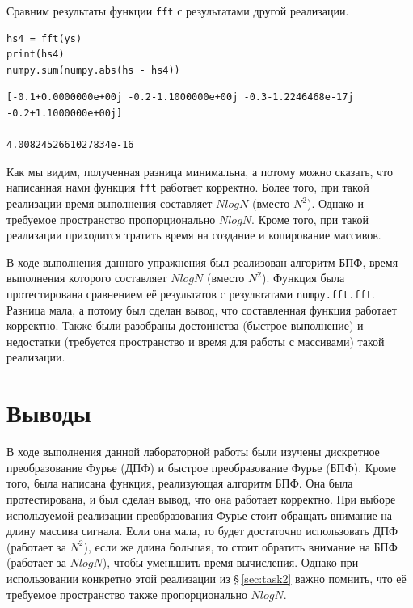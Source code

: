 \documentclass[a4paper, 14pt]{extarticle}
\begin{document}
    Сравним результаты функции \texttt{fft} с результатами другой реализации.

    \begin{lstlisting}[caption= Сравнение результатов функций \texttt{fft} и \texttt{numpy.fft.fft}., label={lst:task2_compare_fft}]
hs4 = fft(ys)
print(hs4)
numpy.sum(numpy.abs(hs - hs4))  \end{lstlisting}

    \begin{lstlisting}[numbers=none, caption= Результаты сравнения., label={lst:task2_fft_res}]
[-0.1+0.0000000e+00j -0.2-1.1000000e+00j -0.3-1.2246468e-17j -0.2+1.1000000e+00j]

4.0082452661027834e-16  \end{lstlisting}

    Как мы видим, полученная разница минимальна, а потому можно сказать, что написанная нами функция \texttt{fft}
    работает корректно. Более того, при такой реализации время выполнения составляет $N log N$ (вместо $N^2$).
    Однако и требуемое пространство пропорционально $N log N$. Кроме того, при такой реализации приходится тратить время
    на создание и копирование массивов.

    В ходе выполнения данного упражнения был реализован алгоритм БПФ, время выполнения которого составляет $N log N$
    (вместо $N^2$). Функция была протестирована сравнением её результатов с результатами \texttt{numpy.fft.fft}.
    Разница мала, а потому был сделан вывод, что составленная функция работает корректно. Также были разобраны
    достоинства (быстрое выполнение) и недостатки (требуется пространство и время для работы с массивами) такой реализации.

    \newpage

    \section{Выводы}
    \label{sec:conclusions}

    В ходе выполнения данной лабораторной работы были изучены дискретное преобразование Фурье (ДПФ) и быстрое
    преобразование Фурье (БПФ). Кроме того, была написана функция, реализующая алгоритм БПФ. Она была протестирована, и
    был сделан вывод, что она работает корректно. При выборе используемой реализации преобразования Фурье стоит обращать
    внимание на длину массива сигнала. Если она мала, то будет достаточно использовать ДПФ (работает за $N^2$), если же длина большая, то
    стоит обратить внимание на БПФ (работает за $N log N$), чтобы уменьшить время вычисления. Однако при использовании
    конкретно этой реализации из \S\,\ref{sec:task2} важно помнить, что её требуемое пространство также пропорционально
    $N log N$.
\end{document}
